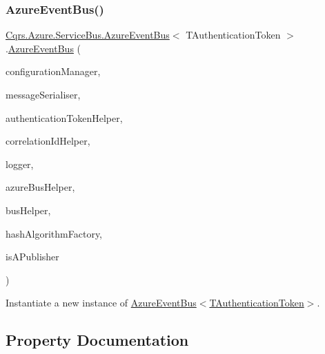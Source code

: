 \subsubsection{\texorpdfstring{Azure\+Event\+Bus()}{AzureEventBus()}}
{\footnotesize\ttfamily \hyperlink{classCqrs_1_1Azure_1_1ServiceBus_1_1AzureEventBus}{Cqrs.\+Azure.\+Service\+Bus.\+Azure\+Event\+Bus}$<$ T\+Authentication\+Token $>$.\hyperlink{classCqrs_1_1Azure_1_1ServiceBus_1_1AzureEventBus}{Azure\+Event\+Bus} (\begin{DoxyParamCaption}\item[{\hyperlink{interfaceCqrs_1_1Configuration_1_1IConfigurationManager}{I\+Configuration\+Manager}}]{configuration\+Manager,  }\item[{\hyperlink{interfaceCqrs_1_1Azure_1_1ServiceBus_1_1IMessageSerialiser}{I\+Message\+Serialiser}$<$ T\+Authentication\+Token $>$}]{message\+Serialiser,  }\item[{\hyperlink{interfaceCqrs_1_1Authentication_1_1IAuthenticationTokenHelper}{I\+Authentication\+Token\+Helper}$<$ T\+Authentication\+Token $>$}]{authentication\+Token\+Helper,  }\item[{I\+Correlation\+Id\+Helper}]{correlation\+Id\+Helper,  }\item[{I\+Logger}]{logger,  }\item[{\hyperlink{interfaceCqrs_1_1Azure_1_1ServiceBus_1_1IAzureBusHelper}{I\+Azure\+Bus\+Helper}$<$ T\+Authentication\+Token $>$}]{azure\+Bus\+Helper,  }\item[{\hyperlink{interfaceCqrs_1_1Bus_1_1IBusHelper}{I\+Bus\+Helper}}]{bus\+Helper,  }\item[{\hyperlink{interfaceCqrs_1_1Bus_1_1IHashAlgorithmFactory}{I\+Hash\+Algorithm\+Factory}}]{hash\+Algorithm\+Factory,  }\item[{bool}]{is\+A\+Publisher }\end{DoxyParamCaption})\hspace{0.3cm}{\ttfamily [protected]}}



Instantiate a new instance of \hyperlink{classCqrs_1_1Azure_1_1ServiceBus_1_1AzureEventBus_aeef9b7bc17c3b114a95fe2134e7c0e7a_aeef9b7bc17c3b114a95fe2134e7c0e7a}{Azure\+Event\+Bus$<$\+T\+Authentication\+Token$>$}. 



\subsection{Property Documentation}
\mbox{\label{classCqrs_1_1Azure_1_1ServiceBus_1_1AzureEventBus_ad1951d2d7ccbf739e9390437d960b3f5_ad1951d2d7ccbf739e9390437d960b3f5}} 
